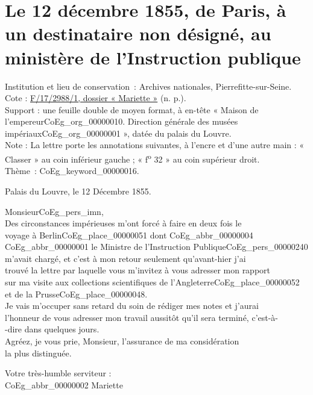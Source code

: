 \documentclass{book}
\begin{document}
\section*{Le 12 décembre 1855, de Paris, à un destinataire non désigné, au ministère de l'Instruction publique}
 \label{labCoEg_Mariette_1855-12-12}
{\footnotesize
\noindent Institution et lieu de conservation~: Archives nationales, Pierrefitte-sur-Seine.\\
Cote : \hyperlink{CoEg_Mariette_ms_002}{F/17/2988/1, dossier « Mariette »} (n. p.).\\
Support : une feuille double de moyen format, à en-tête « Maison de l’empereur\gls{CoEg_org_00000010}. Direction générale des musées impériaux\gls{CoEg_org_00000001} », datée du palais du Louvre.\\
Note : La lettre porte les annotations suivantes, à l’encre et d’une autre main : « Classer » au coin inférieur gauche ; « f\textsuperscript{o} 32 » au coin supérieur droit.\\
Thème~: \gls{CoEg_keyword_00000016}.}

\begin{flushright}Palais du Louvre, le 12 Décembre 1855.\end{flushright}
\hspace{1cm} Monsieur\gls{CoEg_pers_imn},\\

\indent Des circonstances impérieuses m’ont forcé à faire en deux fois le\\
voyage à Berlin\gls{CoEg_place_00000051} dont \gls{CoEg_abbr_00000004} \gls{CoEg_abbr_00000001} le Ministre de l’Instruction Publique\gls{CoEg_pers_00000240}\\
m’avait chargé, et c’est à mon retour seulement qu’avant-hier j’ai\\
trouvé la lettre par laquelle vous m’invitez à vous adresser mon rapport\\
sur ma visite aux collections scientifiques de l’Angleterre\gls{CoEg_place_00000052} et de la Prusse\gls{CoEg_place_00000048}.\\
\indent Je vais m’occuper sans retard du soin de rédiger mes notes et j’aurai\\
l’honneur de vous adresser mon travail aussitôt qu’il sera terminé, c’est-à-\\
-dire dans quelques jours.\\
\indent Agréez, je vous prie, Monsieur, l’assurance de ma considération\\
la plus distinguée.\\
\begin{center}\hspace{5cm}Votre très-humble serviteur :\\
\hspace{5cm}\gls{CoEg_abbr_00000002} Mariette\end{center}
\end{document}
